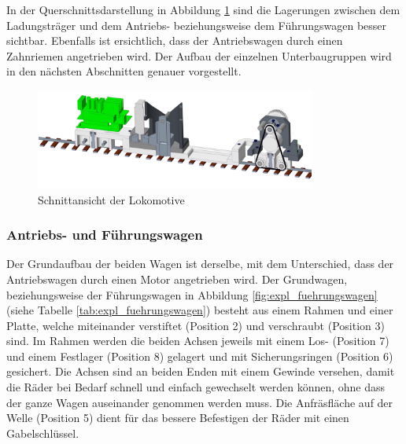 \documentclass[../../main.tex]{subfiles}
\begin{document}
    In der Querschnittsdarstellung in Abbildung \ref{fig:schnitt_lokomotive} sind die Lagerungen zwischen dem Ladungsträger und dem Antriebs- beziehungsweise dem Führungswagen besser sichtbar. Ebenfalls ist ersichtlich, dass der Antriebswagen durch einen Zahnriemen angetrieben wird. Der Aufbau der einzelnen Unterbaugruppen wird in den nächsten Abschnitten genauer vorgestellt.\\

    \begin{figure}[H] %
        \centering
        \includegraphics[width=0.82\textwidth]{lokomotive_2.png}
        \caption{Schnittansicht der Lokomotive}
        \label{fig:schnitt_lokomotive}
    \end{figure}
    \newpage

    \subsubsection{Antriebs- und Führungswagen}
    Der Grundaufbau der beiden Wagen ist derselbe, mit dem Unterschied, dass der Antriebswagen durch einen Motor angetrieben wird. Der Grundwagen, beziehungsweise der Führungswagen in Abbildung \ref{fig:expl_fuehrungswagen} (siehe Tabelle \ref{tab:expl_fuehrungswagen}) besteht aus einem Rahmen und einer Platte, welche miteinander verstiftet (Position 2) und verschraubt (Position 3) sind. Im Rahmen werden die beiden Achsen jeweils mit einem Los- (Position 7) und einem Festlager (Position 8) gelagert und mit Sicherungsringen (Position 6) gesichert. Die Achsen sind an beiden Enden mit einem Gewinde versehen, damit die Räder bei Bedarf schnell und einfach gewechselt werden können, ohne dass der ganze Wagen auseinander genommen werden muss. Die Anfräsfläche auf der Welle (Position 5) dient für das bessere Befestigen der Räder mit einen Gabelschlüssel.\\
\end{document}
